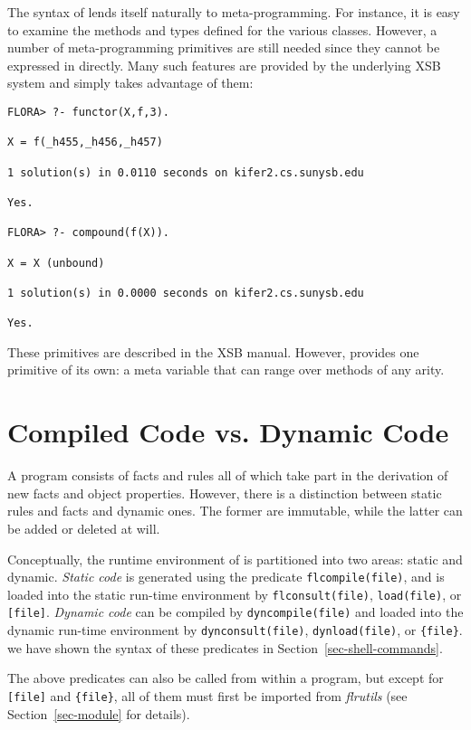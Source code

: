 \documentclass[11pt]{report}
\begin{document}
The syntax of \fl lends itself naturally to meta-programming. For instance,
it is easy to examine the methods and types defined for the various classes.
However, a number of meta-programming primitives are still needed
since they cannot be expressed in \fl directly. Many such features are
provided by the underlying XSB system and \FLORA simply takes advantage of
them: 
\begin{verbatim}
FLORA> ?- functor(X,f,3).

X = f(_h455,_h456,_h457)

1 solution(s) in 0.0110 seconds on kifer2.cs.sunysb.edu

Yes.

FLORA> ?- compound(f(X)).

X = X (unbound)

1 solution(s) in 0.0000 seconds on kifer2.cs.sunysb.edu

Yes.  
\end{verbatim}
These primitives are described in the XSB manual. However, \FLORA provides
one primitive of its own: a meta variable that can range over methods of
any arity.


\section{Compiled Code vs. Dynamic Code}

A \FLORA program consists of facts and rules all of which take part in the
derivation of new facts and object properties.
However, there is a distinction between static rules and facts and dynamic
ones. The former are immutable, while the latter can be added or deleted at
will.

Conceptually, the runtime environment of \FLORA is partitioned into two
areas: static and dynamic. \emph{Static code} is generated using the
predicate {\tt flcompile(file)}, and is loaded into the static run-time
environment by {\tt flconsult(file)}, {\tt load(file)}, or {\tt [file]}.
\emph{Dynamic code} can be compiled by {\tt dyncompile(file)} and loaded
into the dynamic run-time environment by {\tt dynconsult(file)},
{\tt dynload(file)}, or \texttt{\{file\}}.  we have shown the syntax of
these predicates in Section~\ref{sec-shell-commands}.

The above predicates can also be called from within a \FLORA program, but
except for {\tt [file]} and \texttt{\{file\}}, all of them must first be
imported from \emph{flrutils} (see Section~\ref{sec-module} for details).
\end{document}
